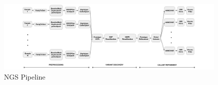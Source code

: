 \begin{figure}
\begin{center}
    \centering
	\includegraphics[scale=0.245]{figure/NGS_Pipeline_GATK.png}
    \caption{NGS Pipeline~\label{NGS_Pipeline_GATK}}
\end{center}
\end{figure}









